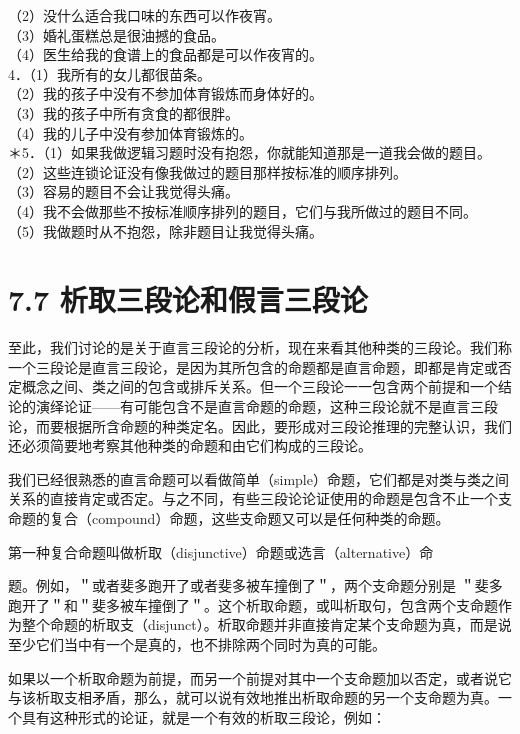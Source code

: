 （2）没什么适合我口味的东西可以作夜宵。\\
（3）婚礼蛋糕总是很油撼的食品。\\
（4）医生给我的食谱上的食品都是可以作夜宵的。\\
4．（1）我所有的女儿都很苗条。\\
（2）我的孩子中没有不参加体育锻炼而身体好的。\\
（3）我的孩子中所有贪食的都很胖。\\
（4）我的儿子中没有参加体育锻炼的。\\
＊5．（1）如果我做逻辑习题时没有抱怨，你就能知道那是一道我会做的题目。\\
（2）这些连锁论证没有像我做过的题目那样按标准的顺序排列。\\
（3）容易的题目不会让我觉得头痛。\\
（4）我不会做那些不按标准顺序排列的题目，它们与我所做过的题目不同。\\
（5）我做题时从不抱怨，除非题目让我觉得头痛。

\section*{7.7 析取三段论和假言三段论}
至此，我们讨论的是关于直言三段论的分析，现在来看其他种类的三段论。我们称一个三段论是直言三段论，是因为其所包含的命题都是直言命题，即都是肯定或否定概念之间、类之间的包含或排斥关系。但一个三段论一一包含两个前提和一个结论的演绎论证——有可能包含不是直言命题的命题，这种三段论就不是直言三段论，而要根据所含命题的种类定名。因此，要形成对三段论推理的完整认识，我们还必须简要地考察其他种类的命题和由它们构成的三段论。

我们已经很熟悉的直言命题可以看做简单（simple）命题，它们都是对类与类之间关系的直接肯定或否定。与之不同，有些三段论论证使用的命题是包含不止一个支命题的复合（compound）命题，这些支命题又可以是任何种类的命题。

第一种复合命题叫做析取（disjunctive）命题或选言（alternative）命

题。例如，＂或者斐多跑开了或者斐多被车撞倒了＂，两个支命题分别是 ＂斐多跑开了＂和＂斐多被车撞倒了＂。这个析取命题，或叫析取句，包含两个支命题作为整个命题的析取支（disjunct）。析取命题并非直接肯定某个支命题为真，而是说至少它们当中有一个是真的，也不排除两个同时为真的可能。

如果以一个析取命题为前提，而另一个前提对其中一个支命题加以否定，或者说它与该析取支相矛盾，那么，就可以说有效地推出析取命题的另一个支命题为真。一个具有这种形式的论证，就是一个有效的析取三段论，例如：


